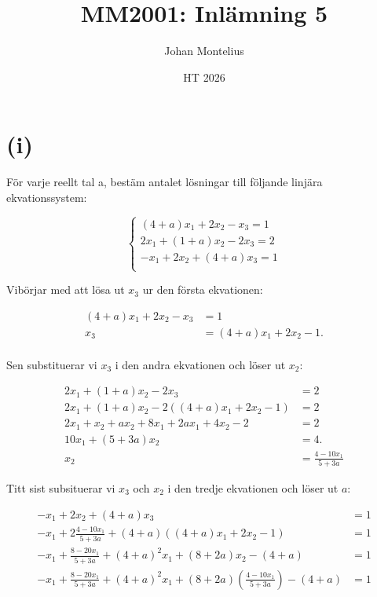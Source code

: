 \documentclass[a4paper, 11pt]{article}
\begin{document}
\title{
    \textbf{MM2001: Inlämning 5}
}
\author{Johan Montelius}
\date{HT 2026}

\maketitle


\section*{(i)}

För varje reellt tal a, bestäm antalet lösningar till följande linjära ekvationssystem:

$$
\begin{cases}
(4 + a)x_1 + 2x_2 - x_3 = 1 \\
2x_1 + (1 + a)x_2 - 2x_3 = 2 \\
-x_1 + 2x_2 + (4 + a)x_3 = 1 \\
\end{cases}
$$

Vibörjar med att lösa ut $x_3$ ur den första ekvationen:

\begin{align*}
  (4 + a)x_1 + 2x_2 - x_3 &= 1 \\  
   x_3 &= (4 + a)x_1 + 2x_2 - 1.\\  
\end{align*}

Sen substituerar vi $x_3$ i den andra ekvationen och löser ut $x_2$:

\begin{align*}
2x_1 + (1 + a)x_2 - 2x_3 &= 2 \\
2x_1 + (1 + a)x_2 - 2((4 + a)x_1 + 2x_2 - 1) &= 2\\
2x_1 + x_2 + ax_2 + 8x_1 + 2ax_1 + 4x_2 - 2 &= 2 \\
10x_1 + (5 + 3a)x_2 &= 4.\\
x_2 &= \frac{4 - 10x_1}{5 + 3a}
\end{align*}

Titt sist subsituerar vi $x_3$ och $x_2$ i den tredje ekvationen och löser ut $a$:



\begin{align*}
  -x_1 + 2x_2 + (4 + a)x_3 &= 1 \\
  -x_1 + 2\frac{4 - 10x_1}{5 + 3a} + (4+a)((4 + a)x_1 + 2x_2 - 1) &= 1\\
  -x_1 + \frac{8 - 20x_1}{5 + 3a} + (4+a)^2 x_1 + (8 + 2a)x_2 - (4+a) &= 1\\
  -x_1 + \frac{8 - 20x_1}{5 + 3a} + (4+a)^2 x_1 + (8 + 2a)(\frac{4 - 10 x_1}{5 + 3a}) - (4+a) &= 1
\end{align*}
\end{document}
